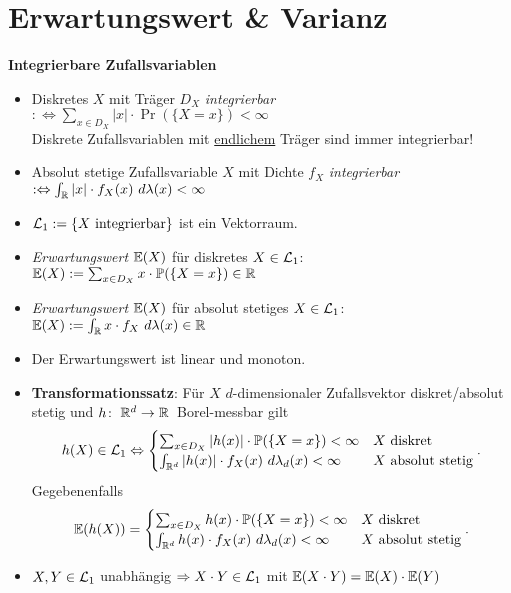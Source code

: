 \section{Erwartungswert \& Varianz}

\textbf{Integrierbare Zufallsvariablen}
\begin{itemize}
\item Diskretes $X$ mit Träger $D_X$ \textit{integrierbar}
  $:\Leftrightarrow \sum_{x \in D_X} |x| \cdot \Pr(\{X=x\}) < \infty$ \\
  Diskrete Zufallsvariablen mit \underline{endlichem} Träger sind immer
  integrierbar!

\item  Absolut stetige Zufallsvariable $X$ mit Dichte $f_X$ \textit{integrierbar}
  \mbox{$:\Leftrightarrow \int_{\mathbb{R}} |x| \cdot f_X(x)~d\lambda(x) < \infty$}

\item $\mathcal{L}_1 := \{X \text{ integrierbar}\}$ ist ein Vektorraum.

\item \textit{Erwartungswert $\mathbb{E}(X)$} für diskretes $X\in\mathcal{L}_1$:
  $\mathbb{E}(X) := \sum_{x \in D_X} x \cdot \mathbb{P}(\{X=x\}) \in\mathbb{R}$

\item \textit{Erwartungswert $\mathbb{E}(X)$} für absolut stetiges $X\in\mathcal{L}_1$:
  $\mathbb{E}(X) := \int_{\mathbb{R}} x\cdot f_X~d\lambda(x) \in\mathbb{R}$

\item Der Erwartungswert ist linear und monoton.

\item \textbf{Transformationssatz}: Für $X$ $d$-dimensionaler Zufallsvektor
  diskret/absolut stetig und \mbox{$h\!:\ \mathbb{R}^d\to\mathbb{R}$ Borel-messbar} gilt
  \[
    h(X)\in\mathcal{L}_1 \Leftrightarrow
    \begin{cases}
    \sum_{x \in D_X} |h(x)| \cdot \mathbb{P}(\{X=x\}) < \infty      & X \text{ diskret}  \\
    \int_{\mathbb{R}^d} |h(x)| \cdot f_X(x)~d\lambda_d(x) < \infty   & X \text{ absolut stetig}
    \end{cases}.
  \]
  Gegebenenfalls
  \[
  	\mathbb{E}(h(X)) =
    \begin{cases}
    \sum_{x \in D_X} h(x) \cdot \mathbb{P}(\{X=x\}) < \infty			& X \text{ diskret} \\
    \int_{\mathbb{R}^d} h(x) \cdot f_X(x)~d\lambda_d(x) < \infty  & X \text{ absolut stetig}
    \end{cases}.
  \]

\item $X,Y\in\mathcal{L}_1$ unabhängig
  $\Rightarrow X \cdot Y \in\mathcal{L}_1$ mit $\mathbb{E}(X \cdot Y) = \mathbb{E}(X) \cdot \mathbb{E}(Y)$
  \marginpar{\vspace{-2.2em}\begin{equation}\label{unabhaengig_e}\end{equation}}
\end{itemize}
\hspace{3em}

